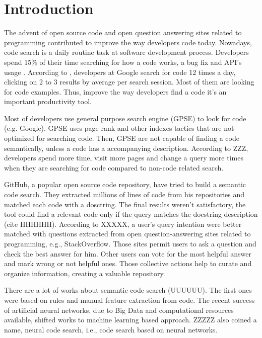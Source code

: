 \documentclass[sigconf]{acmart}
\begin{document}
\maketitle

\section{Introduction}

The advent of open source code and open question answering sites related to programming contributed to improve the way developers code today. Nowadays, code search is a daily routine task at software development process. Developers spend 15\% of their time searching for how a code works, a bug fix and API's usage \cite{what-developers-search-for-on-the-web:xia:2017}. According to \cite{sadowski-how-developers-search-for-code-case-study:2015}, developers at Google search for code 12 times a day, clicking on 2 to 3 results by average per search session. Most of them are looking for code examples. Thus, improve the way developers find a code it's an important productivity tool.  

Most of developers use general purpose search engine (GPSE) to look for code (e.g. Google). GPSE uses page rank and other indexes tactics that are not optimized for searching code. Then, GPSE are not capable of finding a code semantically, unless a code has a accompanying description. According to ZZZ, developers spend more time, visit more pages and change a query more times when they are searching for code compared to non-code related search.

GitHub, a popular open source code repository, have tried to build a semantic code search. They extracted millions of lines of code from his repositories and matched each code with a dosctring. The final results weren't satisfactory, the tool could find a relevant code only if the query matches the docstring description (cite HHHHHH). According to XXXXX, a user's query intention were better matched with questions extracted from open question-answering sites related to programming, e.g., StackOverflow. Those sites permit users to ask a question and check the best answer for him. Other users can vote for the most helpful answer and mark wrong or not helpful ones. Those collective actions help to curate and organize information, creating a valuable repository.

There are a lot of works about semantic code search (UUUUUU). The first ones were based on rules and manual feature extraction from code. The recent success of artificial neural networks, due to Big Data and computational resources available, shifted works to machine learning based approach. ZZZZZ also coined a name, neural code search, i.e., code search based on neural networks.
\end{document}
